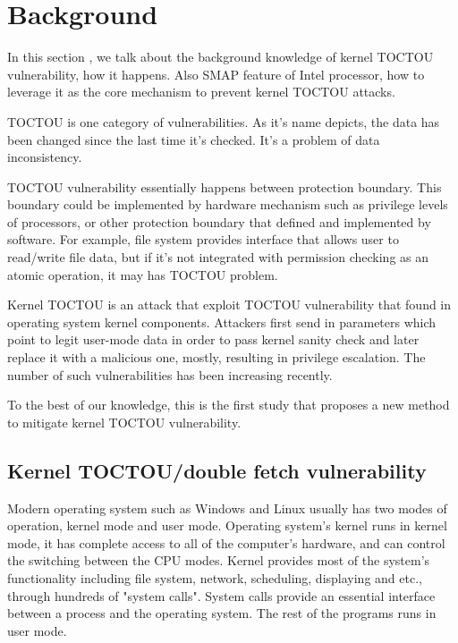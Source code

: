 
\section{Background}

In this section , we talk about the background knowledge of kernel TOCTOU vulnerability, how it happens. Also SMAP feature of Intel processor, how to leverage it as the core mechanism to prevent kernel TOCTOU attacks.  

TOCTOU is one category of vulnerabilities. As it's name depicts, the data has been changed since the last time it's checked. It's a problem of data inconsistency.

TOCTOU vulnerability essentially happens between protection boundary. This boundary could be implemented by hardware mechanism such as privilege levels of processors, or other protection boundary that defined and implemented by software. For example, file system provides interface that allows user to read/write file data, but if it's not integrated with  permission checking as an atomic operation, it may has TOCTOU problem.

Kernel TOCTOU is an attack that exploit TOCTOU vulnerability that found in operating system kernel components. Attackers first send in parameters which point to legit user-mode data in order to pass kernel sanity check and later replace it with a malicious one, mostly, resulting in privilege escalation. The number of such vulnerabilities has been increasing recently.

To the best of our knowledge, this is the first study that proposes a new method to mitigate kernel TOCTOU vulnerability. 

\subsection{Kernel TOCTOU/double fetch vulnerability}

Modern operating system such as Windows and Linux usually has two modes of operation, kernel mode and user mode. Operating system's kernel runs in kernel mode, it has complete access to all of the computer's hardware, and can control the switching between the CPU modes. Kernel provides most of the system's functionality including file system, network, scheduling, displaying and etc., through hundreds of "system calls". System calls provide an essential interface between a process and the operating system. The rest of the programs runs in user mode. 

